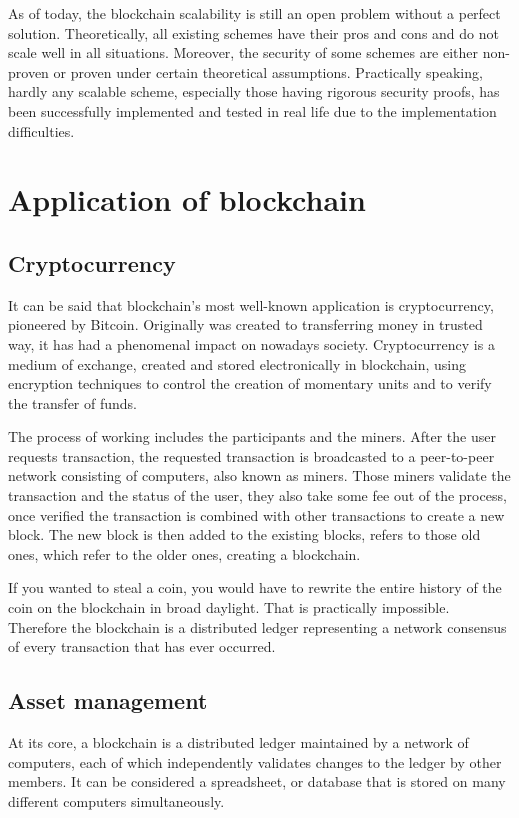 \documentclass[a4paper]{article}
\begin{document}
	As of today, the blockchain scalability is still an open problem without a perfect solution. Theoretically, all existing schemes have their pros and cons and do not scale well in all situations. Moreover, the security of some schemes are either non-proven or proven under certain theoretical assumptions. Practically speaking, hardly any scalable scheme, especially those having rigorous security proofs, has been successfully implemented and tested in real life due to the implementation difficulties.
	
	\section{Application of blockchain}
	\subsection{Cryptocurrency}
	It can be said that blockchain’s most well-known application is cryptocurrency, pioneered by Bitcoin. Originally was created to transferring money in trusted way, it has had a phenomenal impact on nowadays society. Cryptocurrency is a medium of exchange, created and stored electronically in blockchain, using encryption techniques to control the creation of momentary units and to verify the transfer of funds.
	
	The process of working includes the participants and the miners. After the user requests transaction, the requested transaction is broadcasted to a peer-to-peer network consisting of computers, also known as miners. Those miners validate the transaction and the status of the user, they also take some fee out of the process, once verified the transaction is combined with other transactions to create a new block. The new block is then added to the existing blocks, refers to those old ones, which refer to the older ones, creating a blockchain.
	
	If you wanted to steal a coin, you would have to rewrite the entire history of the coin on the blockchain in broad daylight. That is practically impossible. Therefore the blockchain is a distributed ledger representing a network consensus of every transaction that has ever occurred.
	
	\subsection{Asset management}
	At its core, a blockchain is a distributed ledger maintained by a network of computers, each of which independently validates changes to the ledger by other members. It can be considered a spreadsheet, or database that is stored on many different computers simultaneously.
	
\end{document}
